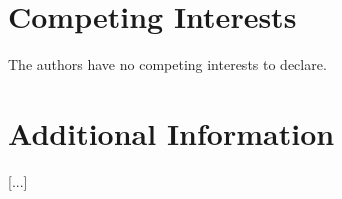 \documentclass[10pt]{article}
\begin{document}
\section*{Competing Interests}
The authors have no competing interests to declare. 

\section*{Additional Information}
[...]












\onecolumn
\end{document}
